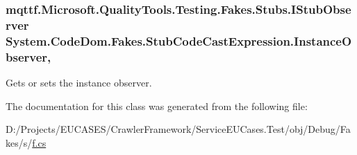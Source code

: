 \hypertarget{class_system_1_1_code_dom_1_1_fakes_1_1_stub_code_cast_expression_a4647bf6f7094251ce9824e70ee0d1b13}{
\subsubsection[{Instance\-Observer}]{\setlength{\rightskip}{0pt plus 5cm}mqttf.\-Microsoft.\-Quality\-Tools.\-Testing.\-Fakes.\-Stubs.\-I\-Stub\-Observer System.\-Code\-Dom.\-Fakes.\-Stub\-Code\-Cast\-Expression.\-Instance\-Observer\hspace{0.3cm}{\ttfamily [get]}, {\ttfamily [set]}}}\label{class_system_1_1_code_dom_1_1_fakes_1_1_stub_code_cast_expression_a4647bf6f7094251ce9824e70ee0d1b13}


Gets or sets the instance observer.



The documentation for this class was generated from the following file\-:\begin{DoxyCompactItemize}
\item 
D\-:/\-Projects/\-E\-U\-C\-A\-S\-E\-S/\-Crawler\-Framework/\-Service\-E\-U\-Cases.\-Test/obj/\-Debug/\-Fakes/s/\hyperlink{s_2f_8cs}{f.\-cs}\end{DoxyCompactItemize}
